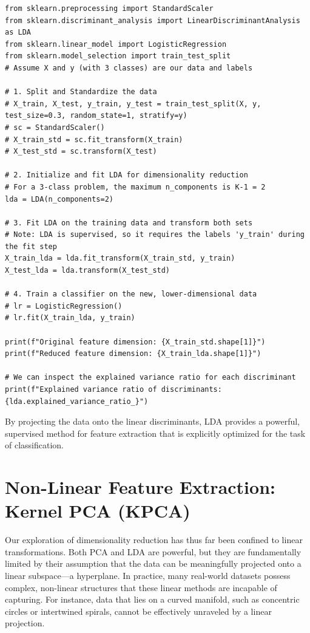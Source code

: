 \begin{enumerate}
\begin{verbatim}
from sklearn.preprocessing import StandardScaler
from sklearn.discriminant_analysis import LinearDiscriminantAnalysis as LDA
from sklearn.linear_model import LogisticRegression
from sklearn.model_selection import train_test_split
# Assume X and y (with 3 classes) are our data and labels

# 1. Split and Standardize the data
# X_train, X_test, y_train, y_test = train_test_split(X, y, test_size=0.3, random_state=1, stratify=y)
# sc = StandardScaler()
# X_train_std = sc.fit_transform(X_train)
# X_test_std = sc.transform(X_test)

# 2. Initialize and fit LDA for dimensionality reduction
# For a 3-class problem, the maximum n_components is K-1 = 2
lda = LDA(n_components=2)

# 3. Fit LDA on the training data and transform both sets
# Note: LDA is supervised, so it requires the labels 'y_train' during the fit step
X_train_lda = lda.fit_transform(X_train_std, y_train)
X_test_lda = lda.transform(X_test_std)

# 4. Train a classifier on the new, lower-dimensional data
# lr = LogisticRegression()
# lr.fit(X_train_lda, y_train)

print(f"Original feature dimension: {X_train_std.shape[1]}")
print(f"Reduced feature dimension: {X_train_lda.shape[1]}")

# We can inspect the explained variance ratio for each discriminant
print(f"Explained variance ratio of discriminants: {lda.explained_variance_ratio_}")
\end{verbatim}
By projecting the data onto the linear discriminants, LDA provides a powerful, supervised method for feature extraction that is explicitly optimized for the task of classification.

\section{Non-Linear Feature Extraction: Kernel PCA (KPCA)}
\label{sec:kpca}

Our exploration of dimensionality reduction has thus far been confined to linear transformations. Both PCA and LDA are powerful, but they are fundamentally limited by their assumption that the data can be meaningfully projected onto a linear subspace—a hyperplane. In practice, many real-world datasets possess complex, non-linear structures that these linear methods are incapable of capturing. For instance, data that lies on a curved manifold, such as concentric circles or intertwined spirals, cannot be effectively unraveled by a linear projection.


\end{enumerate}

